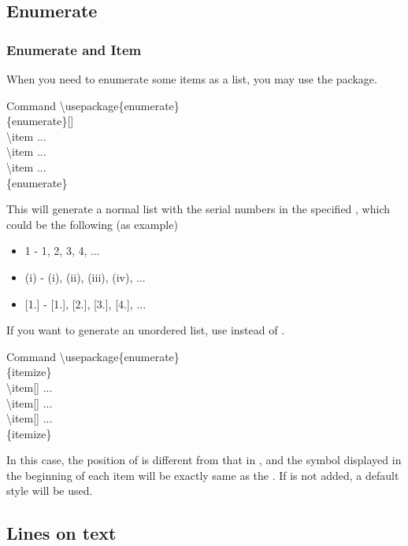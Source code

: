 \documentclass{beamer}
\newenvironment{command}{\begin{block}{Command}}{\end{block}}
\newcommand{\samplebegin}[1]{\structure{\textbackslash begin}\{#1\}}
\newcommand{\sampleend}[1]{\structure{\textbackslash end}\{#1\}}
\newcommand{\samplecommand}[1]{\alert{\textbackslash #1}}
\begin{document}
\subsection{Enumerate}
\begin{frame}
	\frametitle{Enumerate and Item}
	When you need to enumerate some items as a list, you may use the  package.
	\begin{command}
		\samplecommand{usepackage}\{enumerate\}\\
		\samplebegin{enumerate}[]\\
		\qquad\samplecommand{item} ...\\
		\qquad\samplecommand{item} ...\\
		\qquad\samplecommand{item} ...\\
		\sampleend{enumerate}
	\end{command}
	This will generate a normal list with the serial numbers in the specified , which could be the following (as example)
	\begin{itemize}
		\item \alert{1} - 1, 2, 3, 4, ...
		\item \alert{(i)} - (i), (ii), (iii), (iv), ...
		\item \alert{[1.]} - [1.], [2.], [3.], [4.], ...
	\end{itemize}
\end{frame}

\begin{frame}
	If you want to generate an unordered list, use  instead of .
	\begin{command}
		\samplecommand{usepackage}\{enumerate\}\\
		\samplebegin{itemize}\\
		\qquad\samplecommand{item}[] ...\\
		\qquad\samplecommand{item}[] ...\\
		\qquad\samplecommand{item}[] ...\\
		\sampleend{itemize}
	\end{command}
	In this case, the position of  is different from that in , and the symbol displayed in the beginning of each item will be exactly same as the . If  is not added, a default style will be used.
\end{frame}

\subsection{Lines on text}
\end{document}
